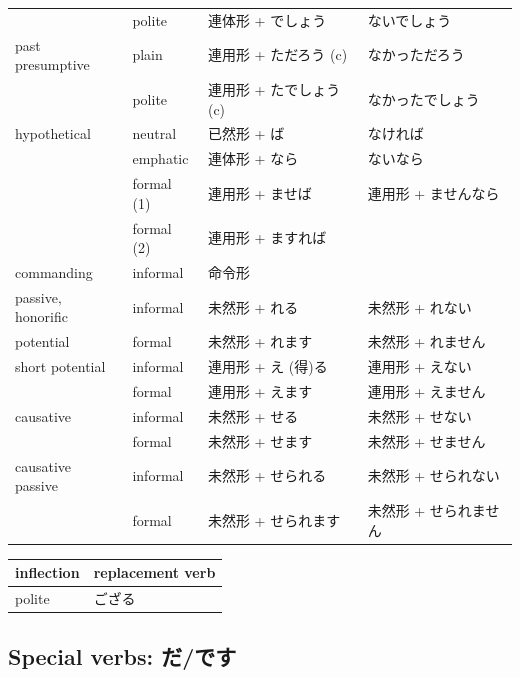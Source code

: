 \documentclass[11pt, b5paper, twoside, openright, onecolumn]{book}
\makeatletter
\newcommand*{\rtrubystack}[2]{{\relscale{0.5}%
  \begin{tabular}[b]{@{}c@{}}%
    {#1}\\%
    {\textscale{2}{#2}}%
  \end{tabular}}%
}
\DeclareRobustCommand*{\rtruby}[2]{%
  \mbox{%
    \setlength{\parskip}{0ex}%
    \BeginAccSupp{method=pdfstringdef,ActualText={#1}}%
      \rtrubystack{\phantom{#2}}{#1}%
      \llap{%
        \rtrubystack{#2}{\phantom{#1}}%
      }%
    \EndAccSupp{}%
  }%
}
\renewcommand*{\rtruby}[2]{#2 (#1)}%
\newenvironment{mytabular}[1]{\noindent\hspace{0.4in}
\begin{tabular}[h]{#1}}{\end{tabular}}
\makeatother
\begin{document}
\begin{longtable}[h]{| l  l  l  l |}
\rule{0pt}{2.4ex} & polite & 連体形 + でしょう & ないでしょう\\ 
\rule{0pt}{2.4ex}past presumptive & plain & 連用形 + ただろう (c) & なかっただろう\\ 
\rule{0pt}{2.4ex} & polite & 連用形 + たでしょう (c) & なかったでしょう\\ 
\rule{0pt}{2.4ex}hypothetical & neutral & 已然形 + ば & なければ\\ 
\rule{0pt}{2.4ex} & emphatic & 連体形 + なら & ないなら\\ 
\rule{0pt}{2.4ex} & formal (1) & 連用形 + ませば & 連用形 + ませんなら\\ 
\rule{0pt}{2.4ex} & formal (2) & 連用形 + ますれば & \\ 
\rule{0pt}{2.4ex}commanding & informal & 命令形  & \\ 
\rule{0pt}{2.4ex}passive‚ honorific & informal & 未然形 + れる & 未然形 + れない\\ 
\rule{0pt}{2.4ex}potential & formal & 未然形 + れます & 未然形 + れません\\ 
\rule{0pt}{3.6ex}short potential & informal & 連用形 + \rtruby{得}{え}る & 連用形 + えない\\ 
\rule{0pt}{2.4ex} & formal & 連用形 + えます & 連用形 + えません\\ 
\rule{0pt}{2.4ex}causative & informal & 未然形 + せる & 未然形 + せない\\ 
\rule{0pt}{2.4ex} & formal & 未然形 + せます & 未然形 + せません\\ 
\rule{0pt}{2.4ex}causative passive & informal & 未然形 + せられる & 未然形 + せられない\\ 
\rule{0pt}{2.4ex} & formal & 未然形 + せられます & 未然形 + せられません\\ 
\end{longtable}
\larger
\vspace{0.5cm}

\smaller
\begin{mytabular}{| l  l |}\hline 
\rule{0pt}{2.4ex}inflection & replacement verb\\ 
\hline
\rule{0pt}{2.4ex}polite & ござる\\ 
\hline 
\end{mytabular}
\larger

\subsection{Special verbs: だ/です}
\end{document}
